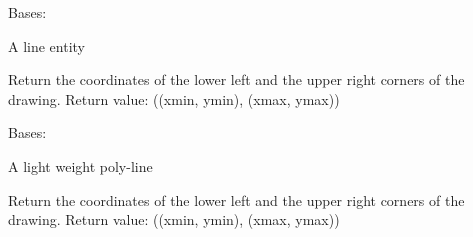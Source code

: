 \documentclass[letterpaper,10pt,english]{sphinxmanual}
\begin{document}
\begin{fulllineitems}
\label{api/gtrace.draw:gtrace.draw.dxf.Line}
Bases: {\hyperref[api/gtrace.draw:gtrace.draw.dxf.Entity]{}}

A line entity

\begin{fulllineitems}
\label{api/gtrace.draw:gtrace.draw.dxf.Line.draw}
\end{fulllineitems}


\begin{fulllineitems}
\label{api/gtrace.draw:gtrace.draw.dxf.Line.report_min_max}
Return the coordinates of the lower left and the upper right corners
of the drawing.
Return value: ((xmin, ymin), (xmax, ymax))

\end{fulllineitems}


\end{fulllineitems}


\begin{fulllineitems}
\label{api/gtrace.draw:gtrace.draw.dxf.LwPolyLine}
Bases: {\hyperref[api/gtrace.draw:gtrace.draw.dxf.Entity]{}}

A light weight poly-line

\begin{fulllineitems}
\label{api/gtrace.draw:gtrace.draw.dxf.LwPolyLine.draw}
\end{fulllineitems}


\begin{fulllineitems}
\label{api/gtrace.draw:gtrace.draw.dxf.LwPolyLine.report_min_max}
Return the coordinates of the lower left and the upper right corners
of the drawing.
Return value: ((xmin, ymin), (xmax, ymax))

\end{fulllineitems}


\end{fulllineitems}
\end{document}

